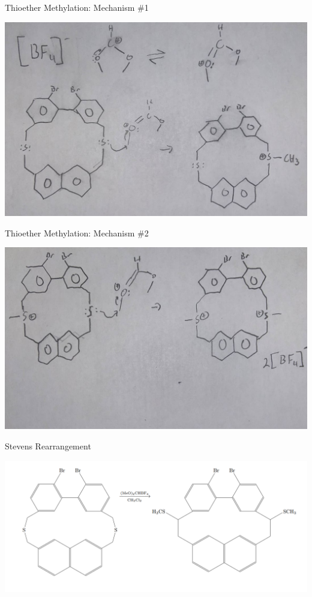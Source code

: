 \documentclass[notes]{beamer}
\begin{document}
\begin{frame}{Thioether Methylation: Mechanism \#1}
\begin{center}
    \includegraphics[scale=.3]{thioether_methylation_one.JPG}
\end{center}
\end{frame}

\begin{frame}{Thioether Methylation: Mechanism \#2}
\begin{center}
    \includegraphics[scale=.4]{Thioether_methylation_Two.JPG}
\end{center}
\end{frame}

\begin{frame}{Stevens Rearrangement}
\begin{center}
    \includegraphics[scale=.46]{stevens_rearrangement_overall.PNG}
\end{center}
\end{frame}
\end{document}
